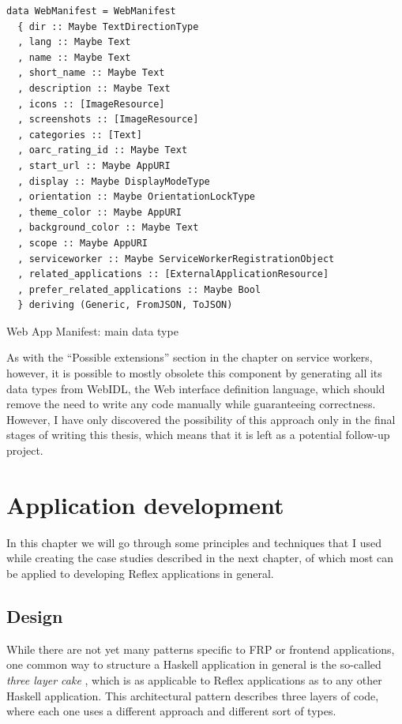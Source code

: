 \documentclass[english,zadani,odsaz]{fitthesis}
\begin{document}
\begin{listing}[tb]
\begin{verbatim}
data WebManifest = WebManifest
  { dir :: Maybe TextDirectionType
  , lang :: Maybe Text
  , name :: Maybe Text
  , short_name :: Maybe Text
  , description :: Maybe Text
  , icons :: [ImageResource]
  , screenshots :: [ImageResource]
  , categories :: [Text]
  , oarc_rating_id :: Maybe Text
  , start_url :: Maybe AppURI
  , display :: Maybe DisplayModeType
  , orientation :: Maybe OrientationLockType
  , theme_color :: Maybe AppURI
  , background_color :: Maybe Text
  , scope :: Maybe AppURI
  , serviceworker :: Maybe ServiceWorkerRegistrationObject
  , related_applications :: [ExternalApplicationResource]
  , prefer_related_applications :: Maybe Bool
  } deriving (Generic, FromJSON, ToJSON)
\end{verbatim}
\caption{Web App Manifest: main data type \label{manifest-type}}
\end{listing}

As with the ``Possible extensions'' section in the chapter on service workers,
however, it is possible to mostly obsolete this component by generating all its
data types from WebIDL, the Web interface definition language, which should
remove the need to write any code manually while guaranteeing correctness.
However, I have only discovered the possibility of this approach only in the
final stages of writing this thesis, which means that it is left as a potential
follow-up project.

\chapter{Application development}
\label{sec:orgd636079}
In this chapter we will go through some principles and techniques that I used
while creating the case studies described in the next chapter, of which most can
be applied to developing Reflex applications in general.

\section{Design}
\label{sec:orgb651dd2}
While there are not yet many patterns specific to FRP or frontend applications,
one common way to structure a Haskell application in general is the so-called
\emph{three layer cake} \cite{three-layer}, which is as applicable to Reflex applications as
to any other Haskell application. This architectural pattern describes three
layers of code, where each one uses a different approach and different sort of
types.
\end{document}
